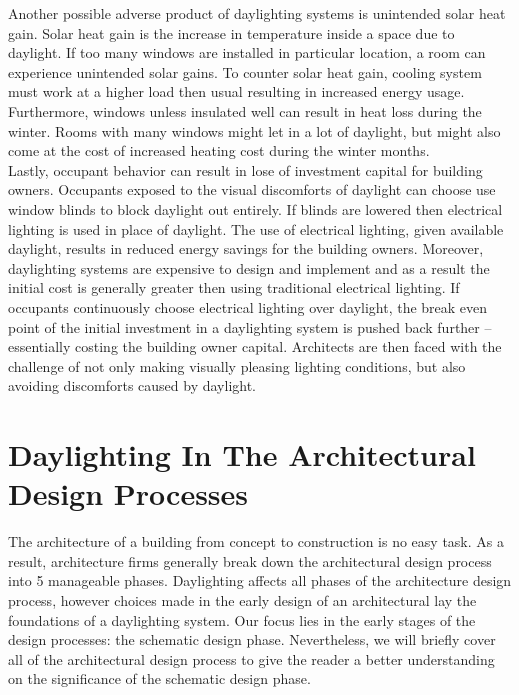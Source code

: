     Another possible adverse product of daylighting systems is unintended solar heat gain. Solar heat gain is the increase in temperature inside a space due to daylight. 
    If too many windows are installed in particular location, a room can experience unintended solar gains.
    To counter solar heat gain, cooling system must work at a higher load then usual resulting in increased energy usage.
    Furthermore, windows unless insulated well can result in heat loss during the winter.
    Rooms with many windows might let in a lot of daylight, but might also come at the cost of increased heating cost during the winter months.\\

    Lastly, occupant behavior can result in lose of investment capital for building owners.
    Occupants exposed to the visual discomforts of daylight can choose use window blinds to block daylight out entirely.
    If blinds are lowered then electrical lighting is used in place of daylight.
    The use of electrical lighting, given available daylight, results in reduced energy savings for the building owners.
    Moreover, daylighting systems are expensive to design and implement and as a result the initial cost is generally greater then using traditional electrical lighting.
    If occupants continuously choose electrical lighting over daylight, the break even point of the initial investment in a daylighting system is pushed back further -- essentially costing the building owner capital.
    Architects are then faced with the challenge of not only making visually pleasing lighting conditions, but also avoiding discomforts caused by daylight.

\section{Daylighting In The Architectural Design Processes}

  The architecture of a building from concept to construction is no easy task.
  As a result, architecture firms generally break down the architectural design process into 5 manageable phases\cite{bazjanac1974architectural}.
  Daylighting affects all phases of the architecture design process, however choices made in the early design of an architectural lay the foundations of a daylighting system.
  Our focus lies in the early stages of the design processes: the schematic design phase.
  Nevertheless, we will briefly cover all of the architectural design process to give the reader a better understanding on the significance of the schematic design phase.

